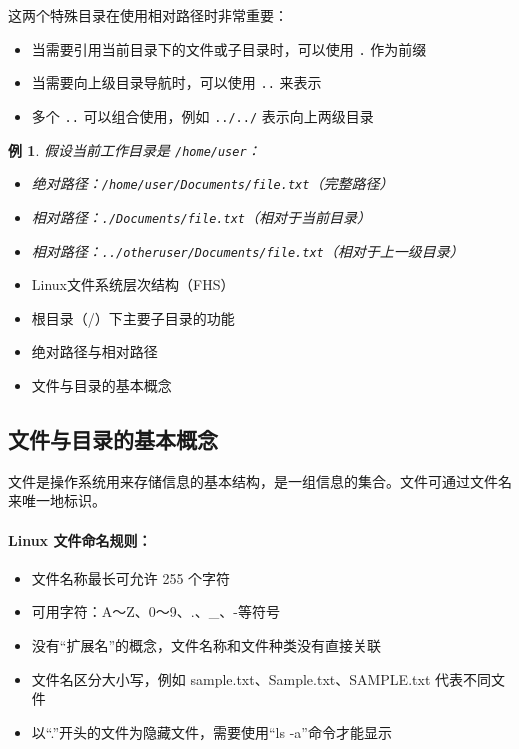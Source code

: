\documentclass[12pt,UTF8]{ctexbook}
\newtheorem{example}{例}[chapter]
\begin{document}
这两个特殊目录在使用相对路径时非常重要：
\begin{itemize}
    \item 当需要引用当前目录下的文件或子目录时，可以使用 \verb+.+ 作为前缀
    \item 当需要向上级目录导航时，可以使用 \verb+..+ 来表示
    \item 多个 \verb+..+ 可以组合使用，例如 \verb+../../+ 表示向上两级目录
\end{itemize}

\begin{example}
假设当前工作目录是 \verb+/home/user+：
\begin{itemize}
    \item 绝对路径：\verb+/home/user/Documents/file.txt+（完整路径）
    \item 相对路径：\verb+./Documents/file.txt+（相对于当前目录）
    \item 相对路径：\verb+../otheruser/Documents/file.txt+（相对于上一级目录）
\end{itemize}
\end{example}

\begin{itemize}
    \item Linux文件系统层次结构（FHS）
    \item 根目录（/）下主要子目录的功能
    \item 绝对路径与相对路径
    \item 文件与目录的基本概念
\end{itemize}

\subsection{文件与目录的基本概念}

文件是操作系统用来存储信息的基本结构，是一组信息的集合。文件可通过文件名来唯一地标识。

\paragraph{Linux 文件命名规则：}
\begin{itemize}
    \item 文件名称最长可允许 255 个字符
    \item 可用字符：A～Z、0～9、.、\_、-等符号
    \item 没有“扩展名”的概念，文件名称和文件种类没有直接关联
    \item 文件名区分大小写，例如 sample.txt、Sample.txt、SAMPLE.txt 代表不同文件
    \item 以“.”开头的文件为隐藏文件，需要使用“ls -a”命令才能显示
\end{itemize}
\end{document}
